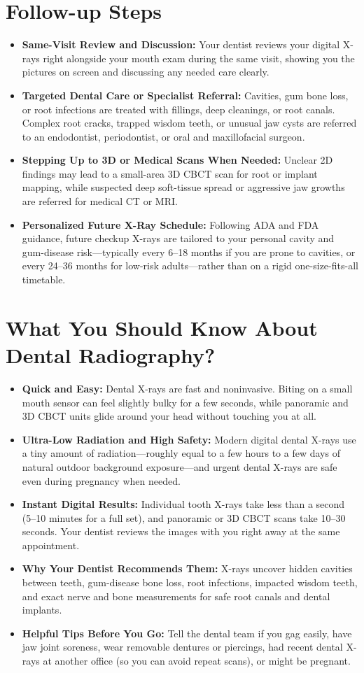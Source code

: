 \section{Follow-up Steps}
\begin{itemize}
\item \textbf{Same-Visit Review and Discussion:} Your dentist reviews your digital X-rays right alongside your mouth exam during the same visit, showing you the pictures on screen and discussing any needed care clearly.
\item \textbf{Targeted Dental Care or Specialist Referral:} Cavities, gum bone loss, or root infections are treated with fillings, deep cleanings, or root canals. Complex root cracks, trapped wisdom teeth, or unusual jaw cysts are referred to an endodontist, periodontist, or oral and maxillofacial surgeon.
\item \textbf{Stepping Up to 3D or Medical Scans When Needed:} Unclear 2D findings may lead to a small-area 3D CBCT scan for root or implant mapping, while suspected deep soft-tissue spread or aggressive jaw growths are referred for medical CT or MRI.
\item \textbf{Personalized Future X-Ray Schedule:} Following ADA and FDA guidance, future checkup X-rays are tailored to your personal cavity and gum-disease risk---typically every 6--18 months if you are prone to cavities, or every 24--36 months for low-risk adults---rather than on a rigid one-size-fits-all timetable.
\end{itemize}

\section{What You Should Know About Dental Radiography?}
\begin{itemize}
\item \textbf{Quick and Easy:} Dental X-rays are fast and noninvasive. Biting on a small mouth sensor can feel slightly bulky for a few seconds, while panoramic and 3D CBCT units glide around your head without touching you at all.
\item \textbf{Ultra-Low Radiation and High Safety:} Modern digital dental X-rays use a tiny amount of radiation---roughly equal to a few hours to a few days of natural outdoor background exposure---and urgent dental X-rays are safe even during pregnancy when needed.
\item \textbf{Instant Digital Results:} Individual tooth X-rays take less than a second (5--10 minutes for a full set), and panoramic or 3D CBCT scans take 10--30 seconds. Your dentist reviews the images with you right away at the same appointment.
\item \textbf{Why Your Dentist Recommends Them:} X-rays uncover hidden cavities between teeth, gum-disease bone loss, root infections, impacted wisdom teeth, and exact nerve and bone measurements for safe root canals and dental implants.
\item \textbf{Helpful Tips Before You Go:} Tell the dental team if you gag easily, have jaw joint soreness, wear removable dentures or piercings, had recent dental X-rays at another office (so you can avoid repeat scans), or might be pregnant.
\end{itemize}

